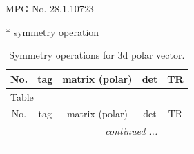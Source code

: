 \documentclass[fleqn,8pt]{jsarticle}
\begin{document}
\setcounter{MaxMatrixCols}{32}

\renewcommand{\tablename}{Table~}
\renewcommand{\figurename}{Figure~}
\begin{center}
\LARGE
MPG No. 28.1.107\quad$23$
\end{center}
* symmetry operation
\renewcommand{\arraystretch}{1.3}
\begin{longtable}{ccccc}
\caption{Symmetry operations for 3d polar vector.}
 \\
 \hline \hline
No. & tag & matrix (polar) & det & TR \\ \hline \endfirsthead

\multicolumn{4}{l}{\tablename\ \thetable{}} \\
 \hline \hline
No. & tag & matrix (polar) & det & TR \\ \hline \endhead

 \hline \hline
\multicolumn{4}{r}{\footnotesize\it continued ...} \\ \endfoot

 \hline \hline
\multicolumn{4}{r}{} \\ \endlastfoot


\end{longtable}
\end{document}
